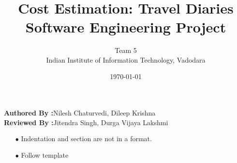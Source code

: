 \documentclass[12pt]{article}
\title{Cost Estimation: Travel Diaries\\Software Engineering Project }
\author{Team 5\\Indian Institute of Information Technology, Vadodara}
\date{\today}
\begin{document}
	\maketitle
	\begin{center}
		\textbf{\Large{Authored By :}}\Large{Nilesh Chaturvedi, Dileep Krishna}  \\
		\textbf{\Large{Reviewed By :}}\Large{Jitendra Singh, Durga Vijaya Lakshmi} \\[2\baselineskip]  
	\end{center}
	
	

	\begin{itemize}
	\item[$\bullet$ ]  Indentation and section are not in a format.
	\item[$\bullet$ ]  Follow template

	
	\end{itemize}
	
	
		
		
	
	
	
\end{document}
